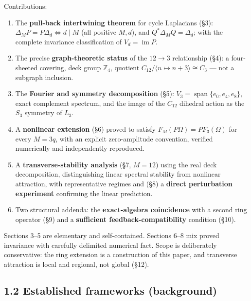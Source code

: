 \documentclass[
  11pt,
  a4paper,
]{article}
\providecommand{\tightlist}{%
  \setlength{\itemsep}{0pt}\setlength{\parskip}{0pt}}
\begin{document}
Contributions:

\begin{enumerate}
\def\labelenumi{\arabic{enumi}.}
\tightlist
\item
  The \textbf{pull-back intertwining theorem} for cycle Laplacians (§3): \(\Delta_M P=P\Delta_d\iff d\mid M\) (all positive \(M,d\)), and \(Q^\ast\Delta_M Q=\Delta_d\); with the complete invariance classification of \(V_d=\operatorname{im}P\).
\item
  The precise \textbf{graph-theoretic status} of the \(12\to3\) relationship (§4): a four-sheeted covering, deck group \(\mathbb Z_4\), quotient \(C_{12}/\langle n\mapsto n{+}3\rangle\cong C_3\) --- not a subgraph inclusion.
\item
  The \textbf{Fourier and symmetry decomposition} (§5): \(V_3=\operatorname{span}\{e_0,e_4,e_8\}\), exact complement spectrum, and the image of the \(C_{12}\) dihedral action as the \(S_3\) symmetry of \(L_3\).
\item
  A \textbf{nonlinear extension} (§6) proved to satisfy \(F_M(P\Omega)=P F_3(\Omega)\) for every \(M=3q\), with an explicit zero-amplitude convention, verified numerically and independently reproduced.
\item
  A \textbf{transverse-stability analysis} (§7, \(M=12\)) using the real deck decomposition, distinguishing linear spectral stability from nonlinear attraction, with representative regimes and (§8) a \textbf{direct perturbation experiment} confirming the linear prediction.
\item
  Two structural addenda: the \textbf{exact-algebra coincidence} with a second ring operator (§9) and a \textbf{sufficient feedback-compatibility} condition (§10).
\end{enumerate}

Sections 3--5 are elementary and self-contained. Sections 6--8 mix proved invariance with carefully delimited numerical fact. Scope is deliberately conservative: the ring extension is a construction of this paper, and transverse attraction is local and regional, not global (§12).

\subsection{1.2 Established frameworks (background)}\label{established-frameworks-background}
\end{document}
